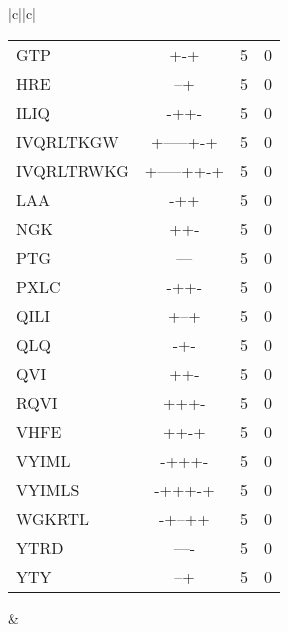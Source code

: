 \documentclass[table,
12pt, %
a4paper, %
oneside, %
headinclude,footinclude, %
BCOR5mm, %
]{scrartcl}
\begin{document}
\begin{table}[htbp]
\begin{adjustbox}{totalheight=\textheight,center}
\begin{tabular}{|c||c|}
\begin{tabular}{l ccc}
GTP&+-+&5&0\\
HRE&--+&5&0\\
ILIQ&-++-&5&0\\
IVQRLTKGW&+-----+-+&5&0\\
IVQRLTRWKG&+-----++-+&5&0\\
LAA&-++&5&0\\
NGK&++-&5&0\\
PTG&---&5&0\\
PXLC&-++-&5&0\\
QILI&+--+&5&0\\
QLQ&-+-&5&0\\
QVI&++-&5&0\\
RQVI&+++-&5&0\\
VHFE&++-+&5&0\\
VYIML&-+++-&5&0\\
VYIMLS&-+++-+&5&0\\
WGKRTL&-+--++&5&0\\
YTRD&----&5&0\\
YTY&--+&5&0\\
\end{tabular} &


\end{tabular}
\end{adjustbox}
\end{table}
\end{document}

